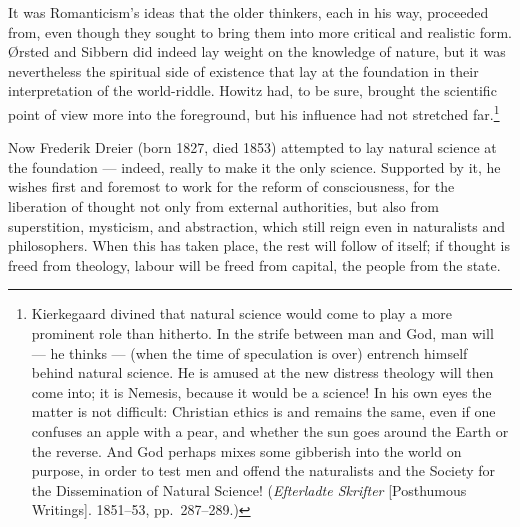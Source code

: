 \documentclass[12pt,a4paper]{book}
\newcommand{\opage}[1]{\marginnote{\footnotesize\textit{[#1]}}}
\begin{document}
It was Romanticism's ideas that the older thinkers, each in his way, proceeded from, even
though they sought to bring them into more critical and realistic form. Ørsted and Sibbern
did indeed lay weight on the knowledge of nature, but it was nevertheless the spiritual side
of existence that lay at the foundation in their interpretation of the world-riddle. Howitz
had, to be sure, brought the scientific point of view more into the foreground, but his
influence had not stretched far.\footnote{Kierkegaard divined that natural science would come
to play a more prominent role than hitherto. In the strife between man and God, man will ---
he thinks --- (when the time of speculation is over) entrench himself behind natural science.
He is amused at the new distress theology will then come into; it is Nemesis, because it
would be a science! In his own eyes the matter is not difficult: Christian ethics is and
remains the same, even if one confuses an apple with a pear, and whether the sun goes around
the Earth or the reverse. And God perhaps mixes some gibberish into the world on purpose, in
order to test men and offend the naturalists and the Society for the Dissemination of Natural
Science! (\emph{Efterladte Skrifter} [Posthumous Writings]. 1851--53, pp.~287--289.)}

Now Frederik Dreier (born 1827, died 1853) attempted to lay natural science at the
foundation --- indeed, really to make it the \opage{176}only science. Supported by it, he wishes first
and foremost to work for the reform of consciousness, for the liberation of thought not only
from external authorities, but also from superstition, mysticism, and abstraction, which
still reign even in naturalists and philosophers. When this has taken place, the rest will
follow of itself; if thought is freed from theology, labour will be freed from capital, the
people from the state.
\end{document}
